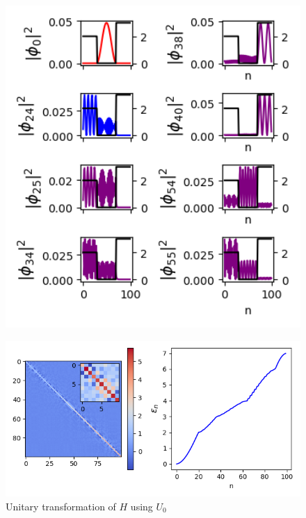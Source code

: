 \documentclass[12pt]{article}
\theoremstyle{definition}
\begin{document}
{\begin{figure}[t!]
\centering
\includegraphics[width=15cm]{p1_6}
\caption{}
\label{fig:method}
\end{figure}
\clearpage

\begin{figure}[t!]
\centering
\includegraphics[width=15cm]{p1_7}
\caption{Unitary transformation of $H$ using $U_{0}$}
\label{fig:method}
\end{figure}

}
\end{document}
